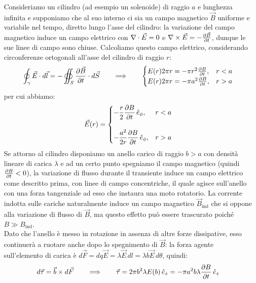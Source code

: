 Consideriamo un cilindro (ad esempio un solenoide) di raggio $ a $ e lunghezza infinita e supponiamo che al suo interno ci sia un campo magnetico $ \vec{B} $ uniforme e variabile nel tempo, diretto lungo l'asse del cilindro: la variazione del campo magnetico induce un campo elettrico con $ \nabla\cdot\vec{E} = 0 $ e $ \nabla\times\vec{E} = -\frac{\partial\vec{B}}{\partial t} $, dunque le sue linee di campo sono chiuse. Calcoliamo questo campo elettrico, considerando circonferenze ortogonali all'asse del cilindro di raggio $ r $:
\begin{equation}
	\oint_{\gamma} \vec{E}\cdot d\vec{l} = - \oiint_{S} \frac{\partial\vec{B}}{\partial t}\cdot d\vec{S} \qquad\Longrightarrow\qquad
	\begin{cases}
		E(r) 2\pi r = - \pi r^2 \frac{\partial B}{\partial t} , & r < a \\
		
		E(r) 2\pi r = - \pi a^2 \frac{\partial B}{\partial t} , & r > a
	\end{cases}
	\label{eq:35}
\end{equation}
per cui abbiamo:
\begin{equation}
	\vec{E}(r) = 
	\begin{cases}
		-\displaystyle\frac{r}{2} \displaystyle\frac{\partial B}{\partial t} \,\hat{e}_{\phi} , & r < a \\
		\\ 
		-\displaystyle\frac{a^2}{2r} \displaystyle\frac{\partial B}{\partial t} \,\hat{e}_{\phi} , & r > a
	\end{cases}
	\label{eq:36}
\end{equation}
%
Se attorno al cilindro disponiamo un anello carico di raggio $ b > a $ con densità lineare di carica $ \lambda $ e ad un certo punto spegniamo il campo magnetico (quindi $ \frac{\partial B}{\partial t} < 0 $), la variazione di flusso durante il transiente induce un campo elettrico come descritto prima, con linee di campo concentriche, il quale agisce sull'anello con una forza tangenziale ad esso che instaura una moto rotatorio. La corrente indotta sulle cariche naturalmente induce un campo magnetico $ \vec{B}_{\text{ind}} $ che si oppone alla variazione di flusso di $ \vec{B} $, ma questo effetto può essere trascurato poiché $ B \gg B_{\text{ind}} $. \\ 
Dato che l'anello è messo in rotazione in assenza di altre forze dissipative, esso continuerà a ruotare anche dopo lo spegnimento di $ \vec{B} $: la forza agente sull'elemento di carica è $ d\vec{F} = dq\vec{E} = \lambda \vec{E}\,dl = \lambda b \vec{E} \,d\theta $, quindi:
\begin{equation}
	d\vec{\tau} = \vec{b}\times d\vec{F} \qquad\Longrightarrow\qquad \vec{\tau} = 2\pi b^2 \lambda E(b) \,\hat{e}_z = -\pi a^2 b \lambda \frac{\partial B}{\partial t} \,\hat{e}_z
	\label{eq:37}
\end{equation}
